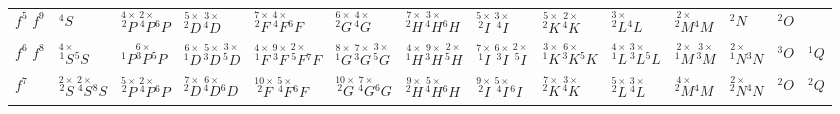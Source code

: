 \begin{table}[h!]
\begin{center}
{\begin{minipage}{\textheight}
{\begin{tabular}{l|l l l l l l l l l l l l l}
 $f^5$ $f^9$ & $^{4}S$ & $\stackrel{4\times}{^{2}P}\,\stackrel{2\times}{^{4}P} {^{6}P}$ & $\stackrel{5\times}{^{2}D}\,\stackrel{3\times}{^{4}D}$ & $\stackrel{7\times}{^{2}F}\,\stackrel{4\times}{^{4}F} {^{6}F}$ & $\stackrel{6\times}{^{2}G}\,\stackrel{4\times}{^{4}G}$ & $\stackrel{7\times}{^{2}H}\,\stackrel{3\times}{^{4}H} {^{6}H}$ & $\stackrel{5\times}{^{2}I}\,\stackrel{3\times}{^{4}I}$ & $\stackrel{5\times}{^{2}K}\,\stackrel{2\times}{^{4}K}$ & $\stackrel{3\times}{^{2}L} {^{4}L}$ & $\stackrel{2\times}{^{2}M} {^{4}M}$ & $^{2}N$ & $^{2}O$ \\
 $f^6$ $f^8$ & $\stackrel{4\times}{^{1}S} {^{5}S}$ & ${^{1}P} \stackrel{6\times}{^{3}P} {^{5}P}$ & $\stackrel{6\times}{^{1}D}\,\stackrel{5\times}{^{3}D}\,\stackrel{3\times}{^{5}D}$ & $\stackrel{4\times}{^{1}F}\,\stackrel{9\times}{^{3}F}\,\stackrel{2\times}{^{5}F} {^{7}F}$ & $\stackrel{8\times}{^{1}G}\,\stackrel{7\times}{^{3}G}\,\stackrel{3\times}{^{5}G}$ & $\stackrel{4\times}{^{1}H}\,\stackrel{9\times}{^{3}H}\,\stackrel{2\times}{^{5}H}$ & $\stackrel{7\times}{^{1}I}\,\stackrel{6\times}{^{3}I}\,\stackrel{2\times}{^{5}I}$ & $\stackrel{3\times}{^{1}K}\,\stackrel{6\times}{^{3}K} {^{5}K}$ & $\stackrel{4\times}{^{1}L}\,\stackrel{3\times}{^{3}L} {^{5}L}$ & $\stackrel{2\times}{^{1}M}\,\stackrel{3\times}{^{3}M}$ & $\stackrel{2\times}{^{1}N} {^{3}N}$ & $^{3}O$ & $^{1}Q$ \\
 $f^7$ & $\stackrel{2\times}{^{2}S}\,\stackrel{2\times}{^{4}S} {^{8}S}$ & $\stackrel{5\times}{^{2}P}\,\stackrel{2\times}{^{4}P} {^{6}P}$ & $\stackrel{7\times}{^{2}D}\,\stackrel{6\times}{^{4}D} {^{6}D}$ & $\stackrel{10\times}{^{2}F}\,\stackrel{5\times}{^{4}F} {^{6}F}$ & $\stackrel{10\times}{^{2}G}\,\stackrel{7\times}{^{4}G} {^{6}G}$ & $\stackrel{9\times}{^{2}H}\,\stackrel{5\times}{^{4}H} {^{6}H}$ & $\stackrel{9\times}{^{2}I}\,\stackrel{5\times}{^{4}I} {^{6}I}$ & $\stackrel{7\times}{^{2}K}\,\stackrel{3\times}{^{4}K}$ & $\stackrel{5\times}{^{2}L}\,\stackrel{3\times}{^{4}L}$ & $\stackrel{4\times}{^{2}M} {^{4}M}$ & $\stackrel{2\times}{^{2}N} {^{4}N}$ & $^{2}O$ & $^{2}Q$ \\
\hline
\end{tabular}
}
\end{minipage}
}
\end{center}
\end{table}
\clearpage

